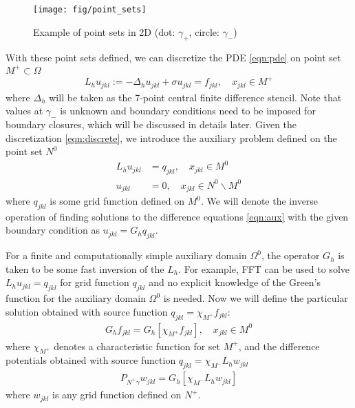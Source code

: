 \begin{figure}[htbp]
\centering
\texttt{[image: fig/point\_sets]}
\caption{Example of point sets in 2D (dot: $\gamma_{+}$, circle: $\gamma_-$)}\label{fig:points}
\end{figure}

With these point sets defined, we can discretize the PDE \eqref{eqn:pde} on point set $M^+\subset\Omega$
\begin{align}\label{eqn:discrete}
L_hu_{jkl}:= -\Delta_h u_{jkl}+\sigma u_{jkl} = f_{jkl},\quad x_{jkl}\in M^+
\end{align}
where $\Delta_h$ will be taken as the 7-point central finite difference stencil.
Note that values at $\gamma_-$ is unknown and boundary conditions need to be imposed for boundary closures, which will be discussed in details later. Given the discretization \eqref{eqn:discrete}, we introduce the auxiliary problem defined on the point set $N^0$
\begin{subequations}\label{eqn:aux}
\begin{align}
L_h u_{jkl} &= q_{jkl},\quad x_{jkl}\in M^0\\
u_{jkl} &= 0,\quad x_{jkl}\in N^0\backslash M^0
\end{align}
\end{subequations}
where $q_{jkl}$ is some grid function defined on $M^0$. We will denote the inverse operation of finding solutions to the difference equations \eqref{eqn:aux} with the given boundary condition as $u_{jkl}=G_hq_{jkl}$.

For a finite and computationally simple auxiliary domain $\Omega^0$, the operator $G_h$ is taken to be some fast inversion of the $L_h$. For example, FFT can be used to solve $L_h u_{jkl}=q_{jkl}$ for grid function $q_{jkl}$ and no explicit knowledge of the Green's function for the auxiliary domain $\Omega^0$ is needed. Now we will define the particular solution obtained with source function $q_{jkl}=\chi_{M^+}f_{jkl}$:
\begin{align}\label{eqn:ps}
G_hf_{jkl} = G_h[\chi_{M^+}f_{jkl}],\quad x_{jkl}\in M^0
\end{align}
where $\chi_{M^+}$ denotes a characteristic function for set $M^+$, and the difference potentials obtained with source function $q_{jkl}=\chi_{M^-}L_hw_{jkl}$
\begin{align}\label{eqn:dp}
P_{N^+\gamma}w_{jkl}=G_h[\chi_{M^-}L_hw_{jkl}]
\end{align}
where $w_{jkl}$ is any grid function defined on $N^+$.

